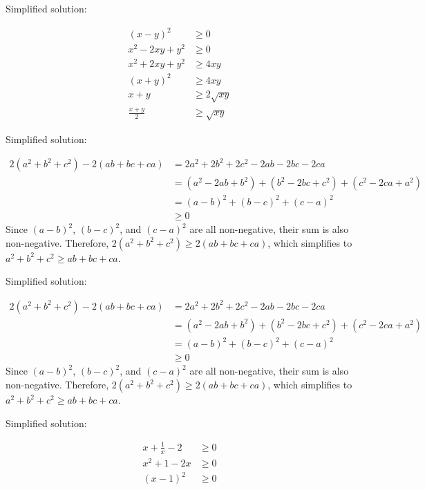 \documentclass{article}
\begin{document}
Simplified solution:
\begin{tcolorbox}[colback=blue!10, width=\linewidth]
\begin{align*} (x-y)^2 &\ge 0 \\ x^2 - 2xy + y^2 &\ge 0 \\ x^2 + 2xy + y^2 &\ge 4xy \\ (x+y)^2 &\ge 4xy \\ x+y &\ge 2\sqrt{xy} \\ \frac{x+y}{2} &\ge \sqrt{xy}\end{align*} 

\end{tcolorbox}



Simplified solution:
\begin{tcolorbox}[colback=blue!10, width=\linewidth]
\begin{align*} 2(a^2 + b^2 + c^2) - 2(ab + bc + ca) &= 2a^2 + 2b^2 + 2c^2 - 2ab - 2bc - 2ca \\ &= (a^2 - 2ab + b^2) + (b^2 - 2bc + c^2) + (c^2 - 2ca + a^2) \\ &= (a - b)^2 + (b - c)^2 + (c - a)^2 \\ &\geq 0\end{align*} 
Since $(a-b)^2$, $(b-c)^2$, and $(c-a)^2$ are all non-negative, their sum is also non-negative.  Therefore, $2(a^2 + b^2 + c^2) \geq 2(ab + bc + ca)$, which simplifies to $a^2 + b^2 + c^2 \geq ab + bc + ca$.

\end{tcolorbox}



Simplified solution:
\begin{tcolorbox}[colback=blue!10, width=\linewidth]
\begin{align*} 2(a^2 + b^2 + c^2) - 2(ab + bc + ca) &= 2a^2 + 2b^2 + 2c^2 - 2ab - 2bc - 2ca \\ &= (a^2 - 2ab + b^2) + (b^2 - 2bc + c^2) + (c^2 - 2ca + a^2) \\ &= (a - b)^2 + (b - c)^2 + (c - a)^2 \\ &\geq 0\end{align*} 
Since $(a-b)^2$, $(b-c)^2$, and $(c-a)^2$ are all non-negative, their sum is also non-negative.  Therefore, $2(a^2 + b^2 + c^2) \geq 2(ab + bc + ca)$, which simplifies to $a^2 + b^2 + c^2 \geq ab + bc + ca$.

\end{tcolorbox}



Simplified solution:
\begin{tcolorbox}[colback=blue!10, width=\linewidth]
\begin{align*} x + \frac{1}{x} - 2 &\geq 0 \\ x^2 + 1 - 2x &\geq 0 \\ (x-1)^2 &\geq 0\end{align*} 

\end{tcolorbox}
\end{document}

